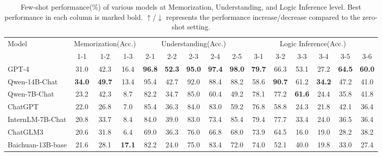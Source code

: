 \begin{table*}[t]
\scriptsize
\centering
\vspace{-5mm}
\caption{Few-shot performance(\%) of various models at Memorization, Understanding, and Logic Inference level. Best performance in each column is marked bold. $\uparrow$/$\downarrow$ represents the performance increase/decrease compared to the zero-shot setting.}
\begin{tabular}{l|ccc|ccccc|cccccc}
\hline
\multirow{2}{*}{Model} & \multicolumn{3}{c|}{Memorization(Acc.)} & \multicolumn{5}{c|}{Understanding(Acc.)} & \multicolumn{6}{c}{Logic Inference(Acc.)}     \\
                       & 1-1       & 1-2       & 1-3       & 2-1   & 2-2   & 2-3  & 2-4  & 2-5  & 3-1  & 3-2  & 3-3  & 3-4  & 3-5  & 3-6  \\ \hline
GPT-4             & 31.0          & 42.3          & 16.4          & \textbf{96.8} & \textbf{52.3} & \textbf{95.0} & \textbf{97.4} & \textbf{98.0} & \textbf{79.7} & 66.3          & 53.1          & 27.2          & \textbf{64.5} & \textbf{60.0} \\
Qwen-14B-Chat     & \textbf{34.0} & \textbf{49.7} & 13.4          & 95.4          & 42.7          & 92.0          & 88.4          & 88.2          & 58.6          & \textbf{90.7} & 61.2          & \textbf{34.2} & 47.2          & 41.0          \\
Qwen-7B-Chat      & 23.2          & 42.3          & 8.7           & 82.2          & 34.7          & 85.0          & 60.4          & 49.2          & 78.1          & 77.2          & \textbf{61.6} & 24.4          & 35.8          & 41.8          \\
ChatGPT           & 22.0          & 26.8          & 7.0           & 85.4          & 36.3          & 84.0          & 83.0          & 59.2          & 76.8          & 58.8          & 24.3          & 21.8          & 42.1          & 36.4          \\
InternLM-7B-Chat  & 20.8          & 33.7          & 8.4           & 84.0          & 39.0          & 83.0          & 73.4          & 85.4          & 79.4          & 77.7          & 33.4          & 24.0          & 36.5          & 36.4          \\
ChatGLM3          & 20.6          & 31.8          & 6.4           & 69.0          & 36.3          & 76.0          & 66.8          & 68.0          & 73.9          & 64.5          & 16.0          & 19.0          & 28.2          & 38.2          \\
Baichuan-13B-base & 21.6          & 28.1          & \textbf{17.1} & 82.2          & 24.0          & 75.0          & 83.4          & 72.0          & 74.0          & 52.1          & 40.0          & 19.8          & 33.0          & 27.4          \\

\end{tabular}
\end{table*}
